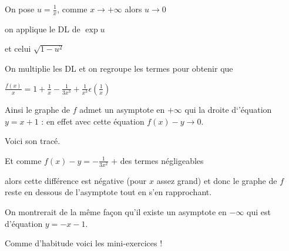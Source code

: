 \change

On pose $u=\frac1x$, comme $x\to +\infty$ alors $u\to 0$

on applique le DL de $\exp u$

et celui $\sqrt{1-u^2}$

\change

On multiplie les DL et on regroupe les termes pour obtenir que 

 $\frac{f(x)}{x} = 1+\frac{1}{x}-\frac{1}{3x^3} +\frac{1}{x^3}\epsilon(\frac{1}{x}) $


\change

Ainsi le graphe de $f$ admet un asymptote en $+\infty$ qui
la droite d`'équation $y=x+1$ : en effet avec cette équation $f(x)-y \to 0$.

\change

Voici son tracé.

\change

Et comme $f(x)-y=-\frac{1}{3x^2}$ + des termes négligeables 

\change

alors cette différence est négative (pour $x$ assez grand)
et donc le graphe de $f$ reste en dessous de l'asymptote
tout en s'en rapprochant.

\change

On montrerait de la même façon qu'il existe un asymptote en $-\infty$ qui est d'équation $y=-x-1$.

\diapo

Comme d'habitude voici les mini-exercices !


